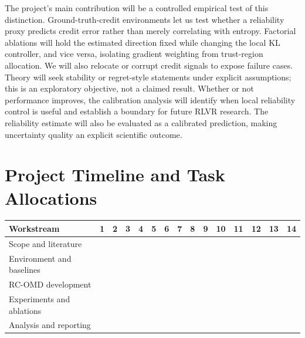 \documentclass[11pt,a4paper]{article}
\newcommand{\ganttcell}{\cellcolor{prismblue!78}\rule{0pt}{1.55ex}}
\newcommand{\blankcell}{\rule{0pt}{1.55ex}}
\begin{document}
The project's main contribution will be a controlled empirical test of this distinction. Ground-truth-credit environments let us test whether a reliability proxy predicts credit error rather than merely correlating with entropy. Factorial ablations will hold the estimated direction fixed while changing the local KL controller, and vice versa, isolating gradient weighting from trust-region allocation. We will also relocate or corrupt credit signals to expose failure cases. Theory will seek stability or regret-style statements under explicit assumptions; this is an exploratory objective, not a claimed result. Whether or not performance improves, the calibration analysis will identify when local reliability control is useful and establish a boundary for future RLVR research. The reliability estimate will also be evaluated as a calibrated prediction, making uncertainty quality an explicit scientific outcome.

\section*{Project Timeline and Task Allocations}

\begin{center}
\normalsize
\setlength{\tabcolsep}{1.55pt}
\renewcommand{\arraystretch}{1.15}
\begin{tabular}{>{\raggedright\arraybackslash}p{4.15cm}*{14}{c}}
\toprule
\textbf{Workstream} & \textbf{1} & \textbf{2} & \textbf{3} & \textbf{4} & \textbf{5} & \textbf{6} & \textbf{7} & \textbf{8} & \textbf{9} & \textbf{10} & \textbf{11} & \textbf{12} & \textbf{13} & \textbf{14} \\
\midrule
Scope and literature
& \ganttcell & \ganttcell & \blankcell & \blankcell & \blankcell & \blankcell & \blankcell & \blankcell & \blankcell & \blankcell & \blankcell & \blankcell & \blankcell & \blankcell \\
Environment and baselines
& \blankcell & \ganttcell & \ganttcell & \ganttcell & \ganttcell & \blankcell & \blankcell & \blankcell & \blankcell & \blankcell & \blankcell & \blankcell & \blankcell & \blankcell \\
RC-OMD development
& \blankcell & \blankcell & \ganttcell & \ganttcell & \ganttcell & \ganttcell & \ganttcell & \ganttcell & \blankcell & \blankcell & \blankcell & \blankcell & \blankcell & \blankcell \\
Experiments and ablations
& \blankcell & \blankcell & \blankcell & \blankcell & \ganttcell & \ganttcell & \ganttcell & \ganttcell & \ganttcell & \ganttcell & \ganttcell & \ganttcell & \blankcell & \blankcell \\
Analysis and reporting
& \blankcell & \blankcell & \blankcell & \blankcell & \blankcell & \blankcell & \blankcell & \ganttcell & \ganttcell & \ganttcell & \ganttcell & \ganttcell & \ganttcell & \ganttcell \\
\bottomrule
\end{tabular}
\end{center}
\end{document}
